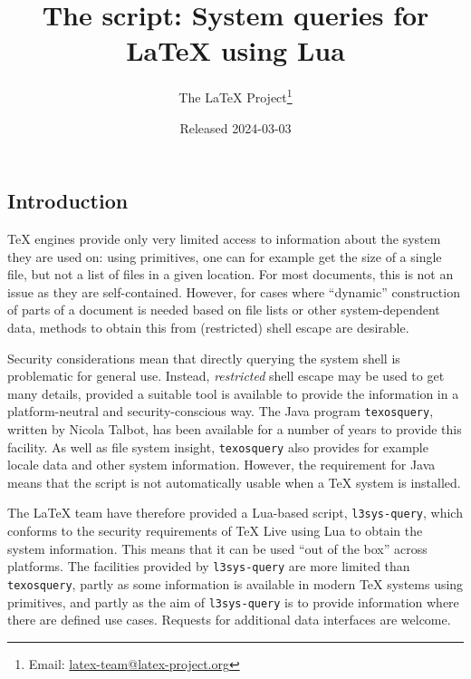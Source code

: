 \documentclass{l3doc}
\begin{document}
\title{The  script: System queries for LaTeX using Lua}

\author{%
  The \LaTeX{} Project\thanks{%
    Email: \href{mailto:latex-team@latex-project.org}
      {latex-team@latex-project.org}%
  }%
}

\date{Released 2024-03-03}

\maketitle
\tableofcontents

\begin{documentation}

\section{Introduction}

\TeX{} engines provide only very limited access to information about the system
they are used on: using primitives, one can for example get the size of a single
file, but not a list of files in a given location. For most documents, this is
not an issue as they are self-contained. However, for cases where
\enquote{dynamic} construction of parts of a document is needed based on file
lists or other system-dependent data, methods to obtain this from (restricted)
shell escape are desirable.

Security considerations mean that directly querying the system shell is
problematic for general use. Instead, \emph{restricted} shell escape may be used
to get many details, provided a suitable tool is available to provide the
information in a platform-neutral and security-conscious way. The Java program
\texttt{texosquery}, written by Nicola Talbot, has been available for a number
of years to provide this facility. As well as file system insight,
\texttt{texosquery} also provides for example locale data and other system
information. However, the requirement for Java means that the script is not
automatically usable when a \TeX{} system is installed.

The \LaTeX{} team have therefore provided a Lua-based script,
\texttt{l3sys-query}, which conforms to the security requirements of \TeX{} Live
using Lua to obtain the system information. This means that it can be used
\enquote{out of the box} across platforms. The facilities provided by
\texttt{l3sys-query} are more limited than \texttt{texosquery}, partly as some
information is available in modern \TeX{} systems using primitives, and partly
as the aim of \texttt{l3sys-query} is to provide information where there are
defined use cases. Requests for additional data interfaces are welcome.


\end{documentation}
\end{document}
